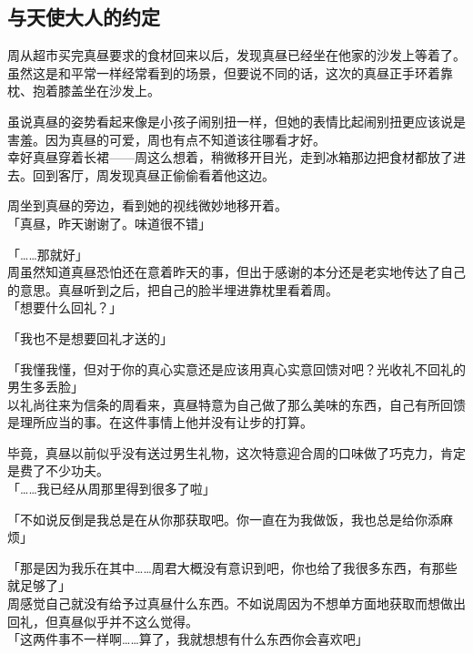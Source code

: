 \subsection{与天使大人的约定}

周从超市买完真昼要求的食材回来以后，发现真昼已经坐在他家的沙发上等着了。\\

虽然这是和平常一样经常看到的场景，但要说不同的话，这次的真昼正手环着靠枕、抱着膝盖坐在沙发上。

虽说真昼的姿势看起来像是小孩子闹别扭一样，但她的表情比起闹别扭更应该说是害羞。因为真昼的可爱，周也有点不知道该往哪看才好。\\

幸好真昼穿着长裙——周这么想着，稍微移开目光，走到冰箱那边把食材都放了进去。回到客厅，周发现真昼正偷偷看着他这边。

周坐到真昼的旁边，看到她的视线微妙地移开着。\\

「真昼，昨天谢谢了。味道很不错」

「……那就好」\\

周虽然知道真昼恐怕还在意着昨天的事，但出于感谢的本分还是老实地传达了自己的意思。真昼听到之后，把自己的脸半埋进靠枕里看着周。\\

「想要什么回礼？」

「我也不是想要回礼才送的」

「我懂我懂，但对于你的真心实意还是应该用真心实意回馈对吧？光收礼不回礼的男生多丢脸」\\

以礼尚往来为信条的周看来，真昼特意为自己做了那么美味的东西，自己有所回馈是理所应当的事。在这件事情上他并没有让步的打算。

毕竟，真昼以前似乎没有送过男生礼物，这次特意迎合周的口味做了巧克力，肯定是费了不少功夫。\\

「……我已经从周那里得到很多了啦」

「不如说反倒是我总是在从你那获取吧。你一直在为我做饭，我也总是给你添麻烦」

「那是因为我乐在其中……周君大概没有意识到吧，你也给了我很多东西，有那些就足够了」\\

周感觉自己就没有给予过真昼什么东西。不如说周因为不想单方面地获取而想做出回礼，但真昼似乎并不这么觉得。\\

「这两件事不一样啊……算了，我就想想有什么东西你会喜欢吧」\\

